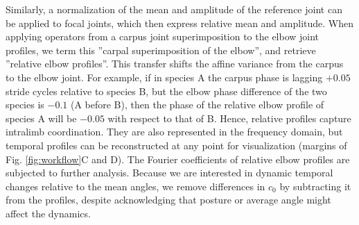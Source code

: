 \documentclass[10pt, a4paper]{article}
\begin{document}
Similarly, a normalization of the mean and amplitude of the reference joint can be applied to focal joints, which then express relative mean and amplitude. 
When applying operators from a carpus joint superimposition to the elbow joint profiles, we term this ''carpal superimposition of the elbow'', and retrieve ''relative elbow profiles''. 
This transfer shifts the affine variance from the carpus to the elbow joint. 
For example, if in species A the carpus phase is lagging $+0.05$ stride cycles relative to species B, but the elbow phase difference of the two species is $-0.1$ (A before B), then the phase of the relative elbow profile of species A will be $-0.05$ with respect to that of B. 
Hence, relative profiles capture intralimb coordination. 
They are also represented in the frequency domain, but temporal profiles can be reconstructed at any point for visualization  (margins of Fig. \ref{fig:workflow}C and D). 
The Fourier coefficients of relative elbow profiles are subjected to further analysis. 
Because we are interested in dynamic temporal changes relative to the mean angles, we remove differences in $c_0$ by subtracting it from the profiles, despite acknowledging that posture or average angle might affect the dynamics. 
\end{document}
